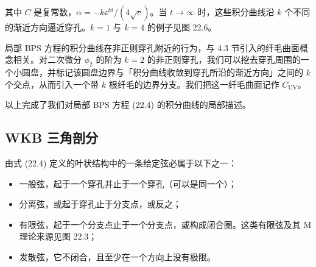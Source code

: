 其中 $C$ 是复常数，$\alpha=-k\ee^{\ii\vartheta}/(4\sqrt{c})$。当 $t\to\infty$ 时，这些积分曲线沿 $k$ 个不同的渐近方向逼近穿孔。$k=1$ 与 $k=4$ 的例子见图 22.6。


\begin{remark}[22.7]
局部 BPS 方程的积分曲线在非正则穿孔附近的行为，与 4.3 节引入的纤毛曲面概念相关。对二次微分 $\phi_2$ 的阶为 $k=2$ 的非正则穿孔，我们可以挖去穿孔周围的一个小圆盘，并标记该圆盘边界与「积分曲线收敛到穿孔所沿的渐近方向」之间的 $k$ 个交点，从而引入一个带 $k$ 根纤毛的边界分支。我们把这一纤毛曲面记作 $C_{\mathrm{UV}}$。
\end{remark}



以上完成了我们对局部 BPS 方程 (22.4) 的积分曲线的局部描述。

\subsection{WKB 三角剖分}

由式 (22.4) 定义的叶状结构中的一条给定弦必属于以下之一：
\begin{itemize}
\item 一般弦，起于一个穿孔并止于一个穿孔（可以是同一个）；
\item 分离弦，或起于穿孔止于分支点，或反之；
\item 有限弦，起于一个分支点止于一个分支点，或构成闭合圈。这类有限弦及其 M 理论来源见图 22.3；
\item 发散弦，它不闭合，且至少在一个方向上没有极限。
\end{itemize}

